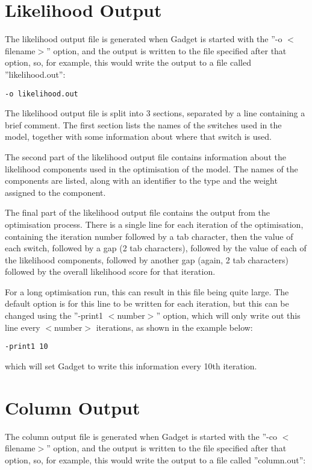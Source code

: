 \documentclass [a4paper, 10pt]{book}
\begin{document}
\section{Likelihood Output}\label{sec:likelihoodoutput}
The likelihood output file is generated when Gadget is started with the ''-o $<$filename$>$'' option, and the output is written to the file specified after that option, so, for example, this would write the output to a file called ''likelihood.out'':

{\small\begin{verbatim}
-o likelihood.out
\end{verbatim}}

The likelihood output file is split into 3 sections, separated by a line containing a brief comment.  The first section lists the names of the switches used in the model, together with some information about where that switch is used.

\bigskip
The second part of the likelihood output file contains information about the likelihood components used in the optimisation of the model.  The names of the components are listed, along with an identifier to the type and the weight assigned to the component.

\bigskip
The final part of the likelihood output file contains the output from the optimisation process.  There is a single line for each iteration of the optimisation, containing the iteration number followed by a tab character, then the value of each switch, followed by a gap (2 tab characters), followed by the value of each of the likelihood components, followed by another gap (again, 2 tab characters) followed by the overall likelihood score for that iteration.

\bigskip
For a long optimisation run, this can result in this file being quite large.  The default option is for this line to be written for each iteration, but this can be changed using the ''-print1 $<$number$>$'' option, which will only write out this line every $<$number$>$ iterations, as shown in the example below:

{\small\begin{verbatim}
-print1 10
\end{verbatim}}

which will set Gadget to write this information every 10th iteration.

\section{Column Output}\label{sec:columnoutput}
The column output file is generated when Gadget is started with the ''-co $<$filename$>$'' option, and the output is written to the file specified after that option, so, for example, this would write the output to a file called ''column.out'':
\end{document}
